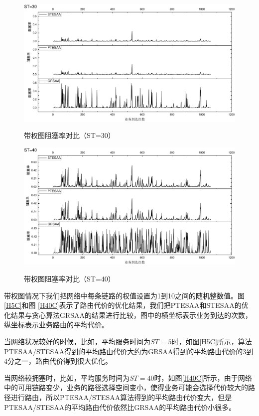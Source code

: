 \begin{figure}
\vspace{-0.7cm}
\setlength{\belowcaptionskip}{-0.5cm}
\begin{center}
{\includegraphics[width=0.8 \textwidth]{figures/H30Z.pdf}}
\end{center}
\caption{{\footnotesize{带权图阻塞率对比（ST=30）}}}
\label{H30Z}
\end{figure}
\begin{figure}
\setlength{\belowcaptionskip}{-0.5cm}
\begin{center}
{\includegraphics[width=0.8 \textwidth]{figures/H40Z.pdf}}
\end{center}
\caption{{\footnotesize{带权图阻塞率对比（ST=40）}}}
\label{H40Z}
\end{figure}
带权图情况下我们把网络中每条链路的权值设置为1到10之间的随机整数值。图 \ref{H5C}和图 \ref{H40C}表示了路由代价的优化结果，我们把PTESAA和STESAA的优化结果与贪心算法GRSAA的结果进行比较，图中的横坐标表示业务到达的次数，纵坐标表示业务路由的平均代价。

当网络状况较好的时候，比如，平均服务时间为$ST=5$时，如图\ref{H5C}所示，算法PTESAA/STESAA得到的平均路由代价大约为GRSAA得到的平均路由代价的3到4分之一，路由代价得到很大优化。

当网络较拥塞时，比如，平均服务时间为$ST=40$时，如图\ref{H40C}所示，由于网络中的可用链路变少，业务的路径选择空间变小，使得业务可能会选择代价较大的路径进行路由，所以PTESAA/STESAA算法得到的平均路由代价变大，但是PTESAA/STESAA的平均路由代价依然比GRSAA的平均路由代价小很多。

